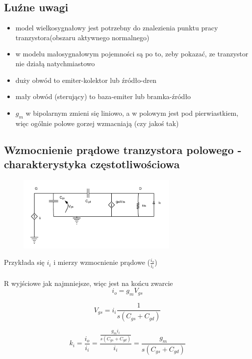 \documentclass[10pt,a4paper]{article}
\begin{document}
\subsection{Luźne uwagi}
\begin{itemize}
\item model wielkosygnałowy jest potrzebny do znalezienia punktu pracy tranzystora(obszaru aktywnego normalnego)
\item w modelu małosygnałowym pojemności są po to, zeby pokazać, ze tranzystor nie działą natychmiastowo
\item duży obwód to emiter-kolektor lub źródło-dren
\item mały obwód (sterujący) to baza-emiter lub bramka-źródło
\item $g_m$ w bipolarnym zmieni się liniowo, a w polowym jest pod pierwiastkiem, więc ogólnie polowe gorzej wzmacniają (czy jakoś tak)
\end{itemize}

\subsection{Wzmocnienie prądowe tranzystora polowego - charakterystyka częstotliwościowa}

\begin{figure}[H]
\centering
\includegraphics[width=0.7\textwidth]{wzmoc_tranzystora.png}
\end{figure}

Przykłada się $i_i$ i mierzy wzmocnienie prądowe ($\frac{i_o}{i_i}$)\\
\\
R wyjściowe jak najmniejsze, więc jest na końcu zwarcie
\begin{equation}
i_o = g_m V_{gs}
\end{equation}

\begin{equation}
V_{gs} = i_i \frac{1}{s(C_{gs} + C_{gd})}
\end{equation}

\begin{equation}
k_i = \frac{i_o}{i_i} = \frac{ \frac{g_m i_i}{s(C_{gs} + C_{gd})} }{i_i} = \frac{g_m}{s(C_{gs} + C_{gd})}
\end{equation}
\end{document}
